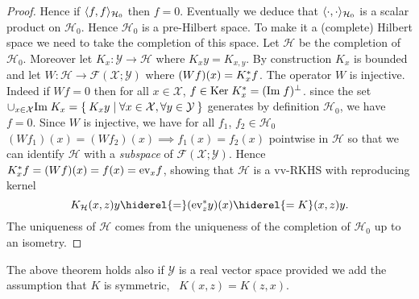 \begin{proof}
Hence if $\langle f,f\rangle_{\mathcal{H}_0}$ then $f=0$. Eventually we deduce that $\langle\cdot,\cdot\rangle_{\mathcal{H}_0}$ is a scalar product on $\mathcal{H}_0$. Hence $\mathcal{H}_0$ is a pre-Hilbert space. To make it a (complete) Hilbert space we need to take the completion of this space. Let $\mathcal{H}$ be the completion of $\mathcal{H}_0$. Moreover let $K_x:\mathcal{Y}\to\mathcal{H}$ where $K_xy=K_{x,y}$. By construction $K_x$ is bounded and let $W:\mathcal{H}\to\mathcal{F}(\mathcal{X};\mathcal{Y})$ where $(Wf)(x)=K_x^* f$. The operator $W$ is injective. Indeed if $Wf=0$ then for all $x\in\mathcal{X}$, $f\in\text{Ker}\; K_x^*=(\text{Im}\; f)^{\bot}$. since the set $\cup_{x\in\mathcal{X}}\text{Im}\; K_x=\Set{K_xy|\forall x\in\mathcal{X}, \forall y\in\mathcal{Y}}$ generates by definition $\mathcal{H}_0$, we have $f=0$. Since $W$ is injective, we have for all $f_1$, $f_2\in\mathcal{H}_0$ $(Wf_1)(x)=(Wf_2)(x){\scriptstyle\implies} f_1(x)=f_2(x)$ pointwise in $\mathcal{H}$ so that we can identify $\mathcal{H}$ with a \emph{subspace} of $\mathcal{F}(\mathcal{X};\mathcal{Y})$. Hence $K_x^* f=(Wf)(x)=f(x)=\text{ev}_xf$, showing that $\mathcal{H}$ is a \acl{vv-RKHS} with reproducing kernel
\begin{dmath*}
K_{\mathcal{H}}(x,z)y\hiderel{=}(\text{ev}^\adjoint_zy)(x)\hiderel{=K}(x,z)y.
\end{dmath*}
The uniqueness of $\mathcal{H}$ comes from the uniqueness of the completion of $\mathcal{H}_0$ up to an isometry.
\end{proof}
The above theorem holds also if $\mathcal{Y}$ is a real vector space provided we add the assumption that $K$ is symmetric, \ie~$K(x,z)=K(z,x)$.
